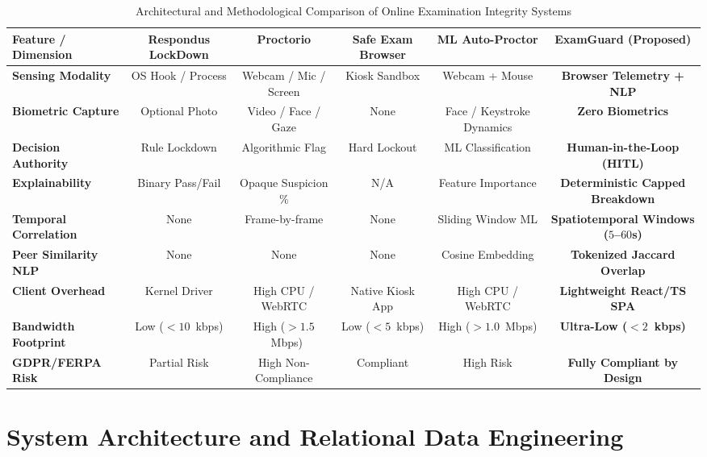 \documentclass[journal]{IEEEtran}
\begin{document}
\begin{table}[t]
\caption{Architectural and Methodological Comparison of Online Examination Integrity Systems}
\label{tab:comparison}
\centering
\begin{tabular}{lccccc}
\toprule
\textbf{Feature / Dimension} & \textbf{Respondus LockDown} & \textbf{Proctorio} & \textbf{Safe Exam Browser} & \textbf{ML Auto-Proctor \cite{aldmour2023}} & \textbf{ExamGuard (Proposed)} \\
\midrule
\textbf{Sensing Modality} & OS Hook / Process & Webcam / Mic / Screen & Kiosk Sandbox & Webcam + Mouse & \textbf{Browser Telemetry + NLP} \\
\textbf{Biometric Capture} & Optional Photo & Video / Face / Gaze & None & Face / Keystroke Dynamics & \textbf{Zero Biometrics} \\
\textbf{Decision Authority} & Rule Lockdown & Algorithmic Flag & Hard Lockout & ML Classification & \textbf{Human-in-the-Loop (HITL)} \\
\textbf{Explainability} & Binary Pass/Fail & Opaque Suspicion \% & N/A & Feature Importance & \textbf{Deterministic Capped Breakdown} \\
\textbf{Temporal Correlation}& None & Frame-by-frame & None & Sliding Window ML & \textbf{Spatiotemporal Windows ($5$--$60$s)} \\
\textbf{Peer Similarity NLP} & None & None & None & Cosine Embedding & \textbf{Tokenized Jaccard Overlap} \\
\textbf{Client Overhead} & Kernel Driver & High CPU / WebRTC & Native Kiosk App & High CPU / WebRTC & \textbf{Lightweight React/TS SPA} \\
\textbf{Bandwidth Footprint} & Low ($<10$~kbps) & High ($>1.5$~Mbps) & Low ($<5$~kbps) & High ($>1.0$~Mbps) & \textbf{Ultra-Low ($<2$~kbps)} \\
\textbf{GDPR/FERPA Risk} & Partial Risk & High Non-Compliance & Compliant & High Risk & \textbf{Fully Compliant by Design} \\
\bottomrule
\end{tabular}
\end{table}

\section{System Architecture and Relational Data Engineering}
\end{document}
